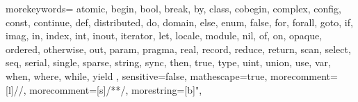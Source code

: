   {
    morekeywords={
      atomic,
      begin, bool, break, by,
      class, cobegin, complex, config, const, continue,
      def, distributed, do, domain,
      else, enum,
      false, for, forall,
      goto,
      if, imag, in, index, int, inout, iterator,
      let, locale,
      module,
      nil,
      of, on, opaque, ordered, otherwise, out,
      param, pragma,
      real, record, reduce, return,
      scan, select, seq, serial, single, sparse, string, sync,
      then, true, type,
      uint, union, use,
      var,
      when, where, while,
      yield
    },
    sensitive=false,
    mathescape=true,
    morecomment=[l]{//},
    morecomment=[s]{/*}{*/},
    morestring=[b]",
}


\newcommand{\chpl}[1]{\lstinline[language=chapel,basicstyle=\small\ttfamily,keywordstyle=]!#1!}
\newcommand{\varname}[1]{\emph{#1}}
\newcommand{\typename}[1]{\emph{#1}}
\newcommand{\fnname}[1]{\chpl{#1}}






\newenvironment{protobody}{\begin{description}\item[\quad\quad] }{\end{description}}
